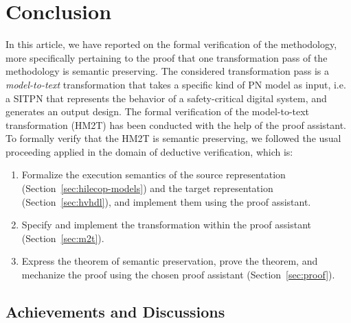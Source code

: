 \documentclass[pdflatex,sn-mathphys]{sn-jnl}%
\theoremstyle{thmstyleone}%
\theoremstyle{thmstyletwo}%
\theoremstyle{thmstylethree}%
\begin{document}
\section{Conclusion}
\label{sec:concl}

In this article, we have reported on the formal verification of the
\hilecop{} methodology, more specifically pertaining to the proof that
one transformation pass of the methodology is semantic preserving.
The considered transformation pass is a \textit{model-to-text}
transformation that takes a specific kind of PN model as input,
i.e. a SITPN that represents the behavior of a safety-critical digital
system, and generates an output \vhdl{} design. The formal
verification of the \hilecop{} model-to-text transformation (HM2T) has
been conducted with the help of the \coq{} proof assistant.  To
formally verify that the HM2T is semantic preserving, we followed the
usual proceeding applied in the domain of deductive verification,
which is:
\begin{enumerate}
\item Formalize the execution semantics of the source representation
  (Section~\ref{sec:hilecop-models}) and the target representation
  (Section~\ref{sec:hvhdl}), and implement them using the proof
  assistant.
\item Specify and implement the transformation within the proof
  assistant (Section~\ref{sec:m2t}).
\item Express the theorem of semantic preservation, prove the theorem,
  and mechanize the proof using the chosen proof assistant
  (Section~\ref{sec:proof}).
\end{enumerate}

\bigskip


\subsection{Achievements and Discussions}
\label{sec:achiev-and-discuss}
\end{document}
